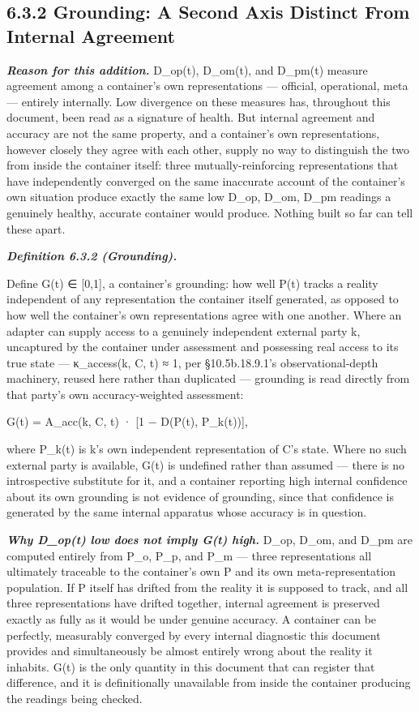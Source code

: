 \documentclass[
]{article}
\begin{document}
\hypertarget{grounding-a-second-axis-distinct-from-internal-agreement}{%
\subsection{6.3.2 Grounding: A Second Axis Distinct From Internal
Agreement}\label{grounding-a-second-axis-distinct-from-internal-agreement}}

\emph{\textbf{Reason for this addition.}} D\_op(t), D\_om(t), and
D\_pm(t) measure agreement among a container's own representations ---
official, operational, meta --- entirely internally. Low divergence on
these measures has, throughout this document, been read as a signature
of health. But internal agreement and accuracy are not the same
property, and a container's own representations, however closely they
agree with each other, supply no way to distinguish the two from inside
the container itself: three mutually-reinforcing representations that
have independently converged on the same inaccurate account of the
container's own situation produce exactly the same low D\_op, D\_om,
D\_pm readings a genuinely healthy, accurate container would produce.
Nothing built so far can tell these apart.

\emph{\textbf{Definition 6.3.2 (Grounding).}}

Define G(t) ∈ {[}0,1{]}, a container's grounding: how well P(t) tracks a
reality independent of any representation the container itself
generated, as opposed to how well the container's own representations
agree with one another. Where an adapter can supply access to a
genuinely independent external party k, uncaptured by the container
under assessment and possessing real access to its true state ---
κ\_access(k, C, t) ≈ 1, per §10.5b.18.9.1's observational-depth
machinery, reused here rather than duplicated --- grounding is read
directly from that party's own accuracy-weighted assessment:

G(t) = A\_acc(k, C, t) · {[}1 − D(P(t), P\_k(t)){]},

where P\_k(t) is k's own independent representation of C's state. Where
no such external party is available, G(t) is undefined rather than
assumed --- there is no introspective substitute for it, and a container
reporting high internal confidence about its own grounding is not
evidence of grounding, since that confidence is generated by the same
internal apparatus whose accuracy is in question.

\emph{\textbf{Why D\_op(t) low does not imply G(t) high.}} D\_op, D\_om,
and D\_pm are computed entirely from P\_o, P\_p, and P\_m --- three
representations all ultimately traceable to the container's own P and
its own meta-representation population. If P itself has drifted from the
reality it is supposed to track, and all three representations have
drifted together, internal agreement is preserved exactly as fully as it
would be under genuine accuracy. A container can be perfectly,
measurably converged by every internal diagnostic this document provides
and simultaneously be almost entirely wrong about the reality it
inhabits. G(t) is the only quantity in this document that can register
that difference, and it is definitionally unavailable from inside the
container producing the readings being checked.
\end{document}
